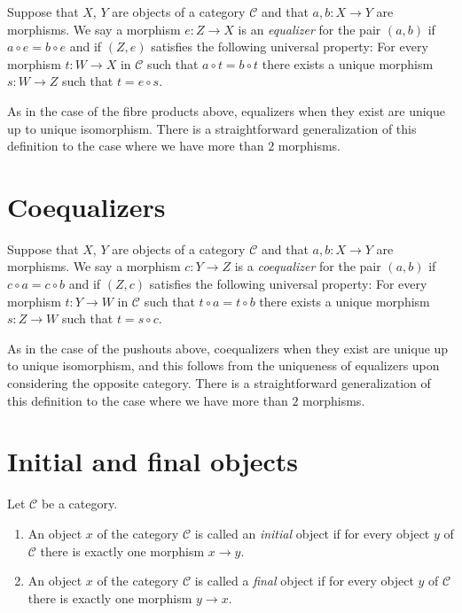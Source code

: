 \begin{definition}
\label{definition-equalizers}
Suppose that $X$, $Y$ are objects of a category $\mathcal{C}$
and that $a, b : X \to Y$ are morphisms. We say a morphism
$e : Z \to X$ is an {\it equalizer} for the pair $(a, b)$ if
$a \circ e = b \circ e$ and if $(Z, e)$ satisfies the following
universal property: For every morphism $t : W \to X$
in $\mathcal{C}$ such that $a \circ t = b \circ t$ there exists
a unique morphism $s : W \to Z$ such that $t = e \circ s$.
\end{definition}

\noindent
As in the case of the fibre products above, equalizers when
they exist are unique up to unique isomorphism. There is a
straightforward generalization of this definition to the
case where we have more than $2$ morphisms.

\section{Coequalizers}
\label{section-coequalizers}

\begin{definition}
\label{definition-coequalizers}
Suppose that $X$, $Y$ are objects of a category $\mathcal{C}$
and that $a, b : X \to Y$ are morphisms. We say a morphism
$c : Y \to Z$ is a {\it coequalizer} for the pair $(a, b)$ if
$c \circ a = c \circ b$ and if $(Z, c)$ satisfies the following
universal property: For every morphism $t : Y \to W$
in $\mathcal{C}$ such that $t \circ a = t \circ b$ there exists
a unique morphism $s : Z \to W$ such that $t = s \circ c$.
\end{definition}

\noindent
As in the case of the pushouts above, coequalizers when
they exist are unique up to unique isomorphism, and this follows
from the uniqueness of equalizers upon considering the opposite
category. There is a straightforward generalization of this definition
to the case where we have more than $2$ morphisms.

\section{Initial and final objects}
\label{section-initial-final}

\begin{definition}
\label{definition-initial-final}
Let $\mathcal{C}$ be a category.
\begin{enumerate}
\item An object $x$ of the category $\mathcal{C}$ is called
an {\it initial} object if for every object $y$ of $\mathcal{C}$
there is exactly one morphism $x \to y$.
\item An object $x$ of the category $\mathcal{C}$ is called
a {\it final} object if for every object $y$ of $\mathcal{C}$
there is exactly one morphism $y \to x$.
\end{enumerate}
\end{definition}

